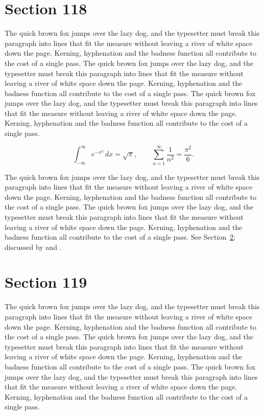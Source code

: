 \documentclass{article}
\begin{document}
\section{Section 118}
\label{sec:118}
The quick brown fox jumps over the lazy dog, and the typesetter must break this paragraph into lines that fit the measure without leaving a river of white space down the page. Kerning, hyphenation and the badness function all contribute to the cost of a single pass. The quick brown fox jumps over the lazy dog, and the typesetter must break this paragraph into lines that fit the measure without leaving a river of white space down the page. Kerning, hyphenation and the badness function all contribute to the cost of a single pass. The quick brown fox jumps over the lazy dog, and the typesetter must break this paragraph into lines that fit the measure without leaving a river of white space down the page. Kerning, hyphenation and the badness function all contribute to the cost of a single pass. 

\begin{equation}\label{eq:118}
\int_{-\infty}^{\infty} e^{-x^{2}}\,dx = \sqrt{\pi}, \qquad
\sum_{n=1}^{\infty} \frac{1}{n^{2}} = \frac{\pi^{2}}{6}.
\end{equation}

The quick brown fox jumps over the lazy dog, and the typesetter must break this paragraph into lines that fit the measure without leaving a river of white space down the page. Kerning, hyphenation and the badness function all contribute to the cost of a single pass. The quick brown fox jumps over the lazy dog, and the typesetter must break this paragraph into lines that fit the measure without leaving a river of white space down the page. Kerning, hyphenation and the badness function all contribute to the cost of a single pass. 
See Section~\ref{sec:119}; discussed by \textcite{k4} and \textcite{l1}.
\section{Section 119}
\label{sec:119}
The quick brown fox jumps over the lazy dog, and the typesetter must break this paragraph into lines that fit the measure without leaving a river of white space down the page. Kerning, hyphenation and the badness function all contribute to the cost of a single pass. The quick brown fox jumps over the lazy dog, and the typesetter must break this paragraph into lines that fit the measure without leaving a river of white space down the page. Kerning, hyphenation and the badness function all contribute to the cost of a single pass. The quick brown fox jumps over the lazy dog, and the typesetter must break this paragraph into lines that fit the measure without leaving a river of white space down the page. Kerning, hyphenation and the badness function all contribute to the cost of a single pass. 
\end{document}
